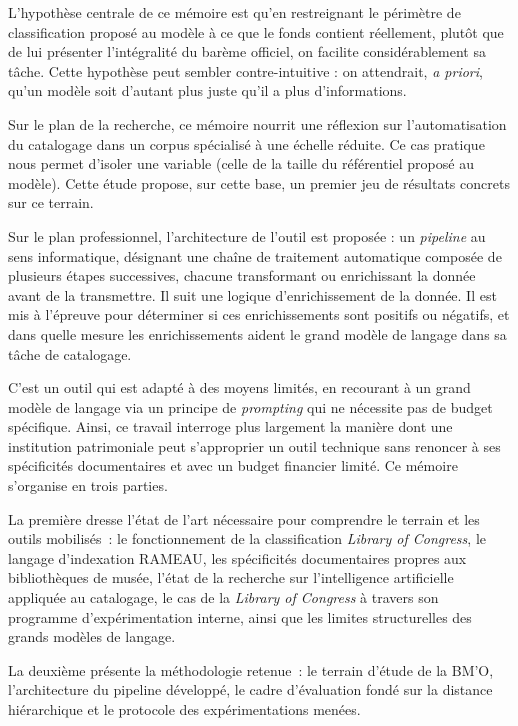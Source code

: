 L'hypothèse centrale de ce mémoire est qu'en restreignant le périmètre de classification proposé au modèle à ce que le fonds contient réellement, plutôt que de lui présenter l'intégralité du barème officiel, on facilite considérablement sa tâche. Cette hypothèse peut sembler contre-intuitive : on attendrait, \emph{a priori}, qu'un modèle soit d'autant plus juste qu'il a plus d'informations.


Sur le plan de la recherche, ce mémoire nourrit une réflexion sur l'automatisation du catalogage dans un corpus spécialisé à une échelle réduite.  Ce cas pratique nous permet d'isoler une variable (celle de la taille du référentiel proposé au modèle). Cette étude propose, sur cette base, un premier jeu de résultats concrets sur ce terrain.



Sur le plan professionnel, l'architecture de l'outil est proposée : un \emph{pipeline} au sens informatique, désignant une chaîne de traitement automatique composée de plusieurs étapes successives, chacune transformant ou enrichissant la donnée avant de la transmettre. Il suit une logique d'enrichissement de la donnée. Il  est mis à l'épreuve pour déterminer si ces enrichissements sont positifs ou négatifs, et dans quelle mesure les enrichissements aident le grand modèle de langage dans sa tâche de catalogage. 

C'est un outil qui est adapté à des moyens limités, en recourant à un grand modèle de langage via un principe de \emph{prompting} qui ne nécessite pas de budget spécifique. Ainsi, ce travail interroge plus largement la manière dont une institution patrimoniale peut s'approprier un outil technique sans renoncer à ses spécificités documentaires et avec un budget financier limité.
Ce mémoire s'organise en trois parties.


La première dresse l'état de l'art nécessaire pour comprendre le terrain et les
outils mobilisés~: le fonctionnement de la classification \textit{Library of
Congress}, le langage d'indexation RAMEAU, les spécificités documentaires propres
aux bibliothèques de musée, l'état de la recherche sur l'intelligence artificielle
appliquée au catalogage, le cas de la \textit{Library of Congress} à travers son
programme d'expérimentation interne, ainsi que les limites structurelles des
grands modèles de langage.

La deuxième présente la méthodologie retenue~: le terrain d'étude de la BM'O,
l'architecture du pipeline développé, le cadre d'évaluation fondé sur la distance
hiérarchique et le protocole des expérimentations menées.

